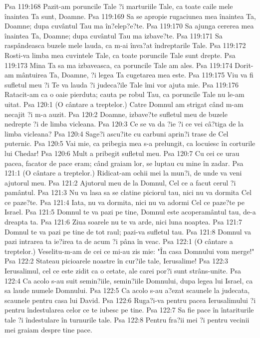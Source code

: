 Psa 119:168  Pazit-am poruncile Tale ?i marturiile Tale, ca toate caile mele înaintea Ta sunt, Doamne.
Psa 119:169  Sa se apropie rugaciunea mea înaintea Ta, Doamne; dupa cuvântul Tau ma în?elep?e?te.
Psa 119:170  Sa ajunga cererea mea înaintea Ta, Doamne; dupa cuvântul Tau ma izbave?te.
Psa 119:171  Sa raspândeasca buzele mele lauda, ca m-ai înva?at îndreptarile Tale.
Psa 119:172  Rosti-va limba mea cuvintele Tale, ca toate poruncile Tale sunt drepte.
Psa 119:173  Mina Ta sa ma izbaveasca, ca poruncile Tale am ales.
Psa 119:174  Dorit-am mântuirea Ta, Doamne, ?i legea Ta cugetarea mea este.
Psa 119:175  Viu va fi sufletul meu ?i Te va lauda ?i judeca?ile Tale îmi vor ajuta mie.
Psa 119:176  Ratacit-am ca o oaie pierduta; cauta pe robul Tau, ca poruncile Tale nu le-am uitat.
Psa 120:1  (O cântare a treptelor.) Catre Domnul am strigat când m-am necajit ?i m-a auzit.
Psa 120:2  Doamne, izbave?te sufletul meu de buzele nedrepte ?i de limba vicleana.
Psa 120:3  Ce se va da ?ie ?i ce vei câ?tiga de la limba vicleana?
Psa 120:4  Sage?i ascu?ite cu carbuni aprin?i trase de Cel puternic.
Psa 120:5  Vai mie, ca pribegia mea s-a prelungit, ca locuiesc în corturile lui Chedar!
Psa 120:6  Mult a pribegit sufletul meu.
Psa 120:7  Cu cei ce urau pacea, facator de pace eram; când graiam lor, se luptau cu mine în zadar.
Psa 121:1  (O cântare a treptelor.) Ridicat-am ochii mei la mun?i, de unde va veni ajutorul meu.
Psa 121:2  Ajutorul meu de la Domnul, Cel ce a facut cerul ?i pamântul.
Psa 121:3  Nu va lasa sa se clatine piciorul tau, nici nu va dormita Cel ce paze?te.
Psa 121:4  Iata, nu va dormita, nici nu va adormi Cel ce paze?te pe Israel.
Psa 121:5  Domnul te va pazi pe tine, Domnul este acoperamântul tau, de-a dreapta ta.
Psa 121:6  Ziua soarele nu te va arde, nici luna noaptea.
Psa 121:7  Domnul te va pazi pe tine de tot raul; pazi-va sufletul tau.
Psa 121:8  Domnul va pazi intrarea ta ie?irea ta de acum ?i pâna în veac.
Psa 122:1  (O cântare a treptelor.) Veselitu-m-am de cei ce mi-au zis mie: "În casa Domnului vom merge!"
Psa 122:2  Stateau picioarele noastre în cur?ile tale, Ierusalime!
Psa 122:3  Ierusalimul, cel ce este zidit ca o cetate, ale carei por?i sunt strâns-unite.
Psa 122:4  Ca acolo s-au suit semin?iile, semin?iile Domnului, dupa legea lui Israel, ca sa laude numele Domnului.
Psa 122:5  Ca acolo s-au a?ezat scaunele la judecata, scaunele pentru casa lui David.
Psa 122:6  Ruga?i-va pentru pacea Ierusalimului ?i pentru îndestularea celor ce te iubesc pe tine.
Psa 122:7  Sa fie pace în întariturile tale ?i îndestulare în turnurile tale.
Psa 122:8  Pentru fra?ii mei ?i pentru vecinii mei graiam despre tine pace.
